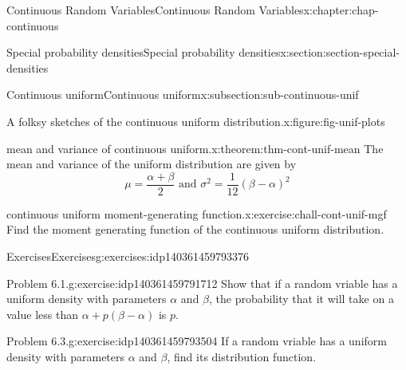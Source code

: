 \documentclass[oneside,10pt,]{book}
\numberwithin{equation}{section}
\begin{document}
\begin{chapterptx}{Continuous Random Variables}{}{Continuous Random Variables}{}{}{x:chapter:chap-continuous}
\begin{sectionptx}{Special probability densities}{}{Special probability densities}{}{}{x:section:section-special-densities}
\begin{subsectionptx}{Continuous uniform}{}{Continuous uniform}{}{}{x:subsection:sub-continuous-unif}
\begin{figureptx}{A folksy sketches of the continuous uniform distribution.}{x:figure:fig-unif-plots}{}
\tcblower
\end{figureptx}%
\begin{theorem}{mean and variance of continuous uniform.}{}{x:theorem:thm-cont-unif-mean}%
The mean and variance of the uniform distribution are given by%
\begin{equation*}
\mu = \dfrac{\alpha + \beta}{2}\text{ and }\sigma^2 =
\dfrac{1}{12}(\beta-\alpha)^2
\end{equation*}
%
\end{theorem}
\begin{inlineexercise}{continuous uniform moment-generating function.}{x:exercise:chall-cont-unif-mgf}%
Find the moment generating function of the continuous uniform distribution.%
\end{inlineexercise}
%
%
\typeout{************************************************}
\typeout{************************************************}
%
\begin{exercises-subsubsection}{Exercises}{}{Exercises}{}{}{g:exercises:idp140361459793376}
\begin{divisionexercise}{1}{Problem 6.1.}{}{g:exercise:idp140361459791712}%
Show that if a random vriable has a uniform density with parameters \(\alpha\) and \(\beta\), the probability that it will take on a value less than \(\alpha + p(\beta - \alpha)\) is \(p\).%
\end{divisionexercise}%
\begin{divisionexercise}{2}{Problem 6.3.}{}{g:exercise:idp140361459793504}%
If a random vriable has a uniform density with parameters \(\alpha\) and \(\beta\), find its distribution function.%
\end{divisionexercise}%
\end{exercises-subsubsection}
\end{subsectionptx}
%
%
\typeout{************************************************}
\typeout{************************************************}
%
\end{sectionptx}
\end{chapterptx}
\end{document}
